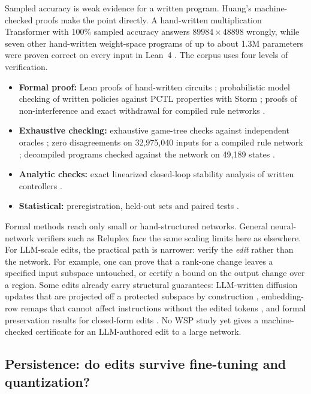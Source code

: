 Sampled accuracy is weak evidence for a written program. Huang's machine-checked proofs make the point directly. A hand-written multiplication Transformer with 100\% sampled accuracy answers $89984 \times 48898$ wrongly, while seven other hand-written weight-space programs of up to about 1.3M parameters were proven correct on every input in Lean~4 \citep{zen23976715}. The corpus uses four levels of verification.
\begin{itemize}[leftmargin=*,itemsep=2pt]
\item \textbf{Formal proof:} Lean proofs of hand-written circuits \citep{zen23976715}; probabilistic model checking of written policies against PCTL properties with Storm \citep{ax2611_11604}; proofs of non-interference and exact withdrawal for compiled rule networks \citep{ax2611_15917}.
\item \textbf{Exhaustive checking:} exhaustive game-tree checks against independent oracles \citep{ax2611_09271}; zero disagreements on 32{,}975{,}040 inputs for a compiled rule network \citep{ax2611_15917}; decompiled programs checked against the network on 49{,}189 states \citep{ax2611_21449}.
\item \textbf{Analytic checks:} exact linearized closed-loop stability analysis of written controllers \citep{ax2611_21958}.
\item \textbf{Statistical:} preregistration, held-out sets and paired tests \citep{ax2611_05341,zen24040591,ax2611_24877,ax2611_21432}.
\end{itemize}
Formal methods reach only small or hand-structured networks. General neural-network verifiers such as Reluplex \citep{ax1702_01135} face the same scaling limits here as elsewhere. For LLM-scale edits, the practical path is narrower: verify the \emph{edit} rather than the network. For example, one can prove that a rank-one change leaves a specified input subspace untouched, or certify a bound on the output change over a region. Some edits already carry structural guarantees: LLM-written diffusion updates that are projected off a protected subspace by construction \citep{ax2611_22228}, embedding-row remaps that cannot affect instructions without the edited tokens \citep{ax2611_09376}, and formal preservation results for closed-form edits \citep{zen23933590}. No WSP study yet gives a machine-checked certificate for an LLM-authored edit to a large network.

\subsection{Persistence: do edits survive fine-tuning and quantization?}
\label{sec:persist}

